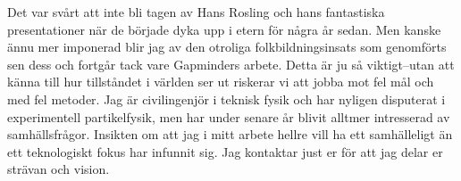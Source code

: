 \documentclass[11pt, a4paper]{../awesome-cv} %
\begin{document}
\makecvheader %

\makelettertitle %


\begin{cvletter}



Det var svårt att inte bli tagen av Hans Rosling och hans fantastiska presentationer när de började dyka upp i etern för några år sedan.  
Men kanske ännu mer imponerad blir jag av den otroliga folkbildningsinsats som genomförts sen dess och fortgår tack vare Gapminders arbete. %
Detta är ju så viktigt–utan att känna till hur tillståndet i världen ser ut riskerar vi att jobba mot fel mål och med fel metoder. %
Jag är civilingenjör i teknisk fysik och har nyligen disputerat i experimentell partikelfysik, men har under senare år blivit alltmer intresserad av samhällsfrågor.
Insikten om att jag i mitt arbete hellre vill ha ett samhälleligt än ett teknologiskt fokus har infunnit sig.
Jag kontaktar just er för att jag delar er strävan och vision.


\end{cvletter}
\end{document}
